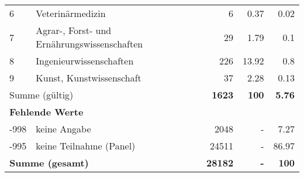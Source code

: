 \begin{longtable}{lXrrr}
     6 &
     \multicolumn{1}{X}{ Veterinärmedizin   } &


       \num{6} &
       \num[round-mode=places,round-precision=2]{0,37} &
         \num[round-mode=places,round-precision=2]{0,02} \\

     7 &
     \multicolumn{1}{X}{ Agrar-, Forst- und Ernährungswissenschaften   } &


       \num{29} &
       \num[round-mode=places,round-precision=2]{1,79} &
         \num[round-mode=places,round-precision=2]{0,1} \\

     8 &
     \multicolumn{1}{X}{ Ingenieurwissenschaften   } &


       \num{226} &
       \num[round-mode=places,round-precision=2]{13,92} &
         \num[round-mode=places,round-precision=2]{0,8} \\

     9 &
     \multicolumn{1}{X}{ Kunst, Kunstwissenschaft   } &


       \num{37} &
       \num[round-mode=places,round-precision=2]{2,28} &
         \num[round-mode=places,round-precision=2]{0,13} \\
     \midrule
     \multicolumn{2}{l}{Summe (gültig)} &
       \textbf{\num{1623}} &
     \textbf{100} &
       \textbf{\num[round-mode=places,round-precision=2]{5,76}} \\
     \multicolumn{5}{l}{\textbf{Fehlende Werte}}\\
       -998 &
       keine Angabe &
         \num{2048} &
        - &
         \num[round-mode=places,round-precision=2]{7,27} \\
       -995 &
       keine Teilnahme (Panel) &
         \num{24511} &
        - &
         \num[round-mode=places,round-precision=2]{86,97} \\
     \midrule
     \multicolumn{2}{l}{\textbf{Summe (gesamt)}} &
          \textbf{\num{28182}} &
        \textbf{-} &
        \textbf{100} \\
     \bottomrule
     \end{longtable}
     
